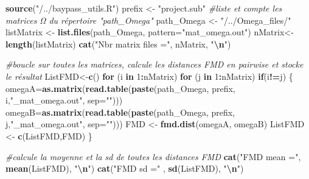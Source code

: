 \documentclass[
  openany]{book}
\newenvironment{Shaded}{\begin{snugshade}}{\end{snugshade}}
\newcommand{\AttributeTok}[1]{\textcolor[rgb]{0.13,0.29,0.53}{#1}}
\newcommand{\CommentTok}[1]{\textcolor[rgb]{0.56,0.35,0.01}{\textit{#1}}}
\newcommand{\ControlFlowTok}[1]{\textcolor[rgb]{0.13,0.29,0.53}{\textbf{#1}}}
\newcommand{\DecValTok}[1]{\textcolor[rgb]{0.00,0.00,0.81}{#1}}
\newcommand{\FunctionTok}[1]{\textcolor[rgb]{0.13,0.29,0.53}{\textbf{#1}}}
\newcommand{\NormalTok}[1]{#1}
\newcommand{\OtherTok}[1]{\textcolor[rgb]{0.56,0.35,0.01}{#1}}
\newcommand{\SpecialCharTok}[1]{\textcolor[rgb]{0.81,0.36,0.00}{\textbf{#1}}}
\newcommand{\StringTok}[1]{\textcolor[rgb]{0.31,0.60,0.02}{#1}}
\theoremstyle{definition}
\theoremstyle{definition}
\theoremstyle{definition}
\theoremstyle{definition}
\theoremstyle{remark}
\begin{document}
\begin{Shaded}
\begin{Highlighting}[]
\FunctionTok{source}\NormalTok{(}\StringTok{"/../baypass\_utils.R"}\NormalTok{)}
\NormalTok{prefix }\OtherTok{\textless{}{-}} \StringTok{"project.sub"}
\CommentTok{\#liste et compte les matrices Ω du répertoire "path\_Omega"}
\NormalTok{path\_Omega }\OtherTok{\textless{}{-}} \StringTok{"/../Omega\_files/"}
\NormalTok{listMatrix }\OtherTok{\textless{}{-}} \FunctionTok{list.files}\NormalTok{(path\_Omega, }\AttributeTok{pattern=}\StringTok{"mat\_omega.out"}\NormalTok{)}
\NormalTok{nMatrix}\OtherTok{\textless{}{-}}\FunctionTok{length}\NormalTok{(listMatrix)}
\FunctionTok{cat}\NormalTok{(}\StringTok{"Nbr matrix files ="}\NormalTok{, nMatrix, }\StringTok{"}\SpecialCharTok{\textbackslash{}n}\StringTok{"}\NormalTok{)}

\CommentTok{\#boucle sur toutes les matrices, calcule les distances FMD en pairwise et stocke le résultat}
\NormalTok{ListFMD}\OtherTok{\textless{}{-}}\FunctionTok{c}\NormalTok{()}
\ControlFlowTok{for}\NormalTok{ (i }\ControlFlowTok{in} \DecValTok{1}\SpecialCharTok{:}\NormalTok{nMatrix) }\ControlFlowTok{for}\NormalTok{ (j }\ControlFlowTok{in} \DecValTok{1}\SpecialCharTok{:}\NormalTok{nMatrix) }\ControlFlowTok{if}\NormalTok{(i}\SpecialCharTok{!=}\NormalTok{j) \{}
\NormalTok{omegaA}\OtherTok{=}\FunctionTok{as.matrix}\NormalTok{(}\FunctionTok{read.table}\NormalTok{(}\FunctionTok{paste}\NormalTok{(path\_Omega, prefix, i,}\StringTok{"\_mat\_omega.out"}\NormalTok{, }\AttributeTok{sep=}\StringTok{""}\NormalTok{)))}
\NormalTok{omegaB}\OtherTok{=}\FunctionTok{as.matrix}\NormalTok{(}\FunctionTok{read.table}\NormalTok{(}\FunctionTok{paste}\NormalTok{(path\_Omega, prefix, j,}\StringTok{"\_mat\_omega.out"}\NormalTok{, }\AttributeTok{sep=}\StringTok{""}\NormalTok{)))}
\NormalTok{FMD }\OtherTok{\textless{}{-}} \FunctionTok{fmd.dist}\NormalTok{(omegaA, omegaB)}
\NormalTok{ListFMD }\OtherTok{\textless{}{-}} \FunctionTok{c}\NormalTok{(ListFMD,FMD)}
\NormalTok{\}}

\CommentTok{\#calcule la moyenne et la sd de toutes les distances FMD}
\FunctionTok{cat}\NormalTok{(}\StringTok{"FMD mean ="}\NormalTok{, }\FunctionTok{mean}\NormalTok{(ListFMD), }\StringTok{"}\SpecialCharTok{\textbackslash{}n}\StringTok{"}\NormalTok{)}
\FunctionTok{cat}\NormalTok{(}\StringTok{"FMD sd ="}\NormalTok{ , }\FunctionTok{sd}\NormalTok{(ListFMD), }\StringTok{"}\SpecialCharTok{\textbackslash{}n}\StringTok{"}\NormalTok{)}


\end{Highlighting}
\end{Shaded}
\end{document}
